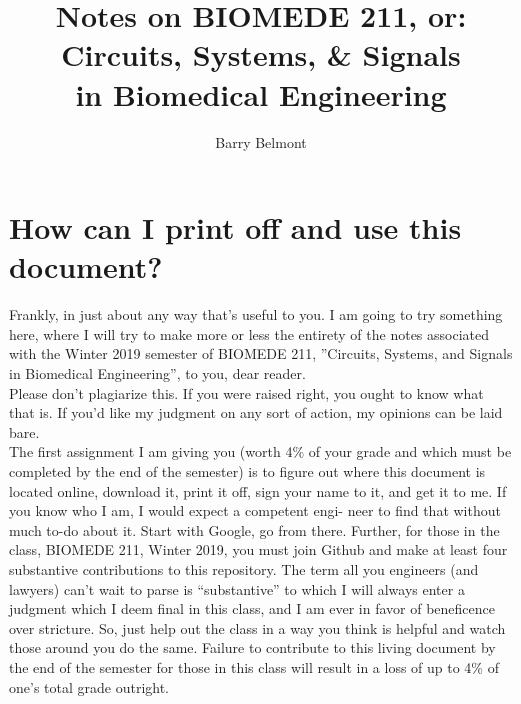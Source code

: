 \documentclass[11pt]{book}
\title{Notes on BIOMEDE 211, or: \\ Circuits, Systems, \& Signals \\ in Biomedical Engineering}
\author{Barry Belmont}
\begin{document}
\frontmatter
\maketitle
\dominitoc
\tableofcontents


\newpage 
\section{How can I print off and use this document?}
Frankly, in just about any way that’s useful to you. I am going to try something here, where I will try to make more or less the entirety of the notes associated with the Winter 2019 semester of BIOMEDE 211, ”Circuits, Systems, and Signals in Biomedical Engineering”, to you, dear reader.
\\
Please don’t plagiarize this. If you were raised right, you ought to know what that is. If you’d like my judgment on any sort of action, my opinions can be laid bare.
\\
The first assignment I am giving you (worth 4\% of your grade and which must be completed by the end of the semester) is to figure out where this document is located online, download it, print it off, sign your name to it, and get it to me. If you know who I am, I would expect a competent engi- neer to find that without much to-do about it. Start with Google, go from there. Further, for those in the class, BIOMEDE 211, Winter 2019, you must join Github and make at least four substantive contributions to this repository. The term all you engineers (and lawyers) can’t wait to parse is “substantive” to which I will always enter a judgment which I deem final in this class, and I am ever in favor of beneficence over stricture. So, just help out the class in a way you think is helpful and watch those around you do the same. Failure to contribute to this living document by the end of the semester for those in this class will result in a loss of up to 4\% of one's total grade outright.

\newpage
\end{document}
